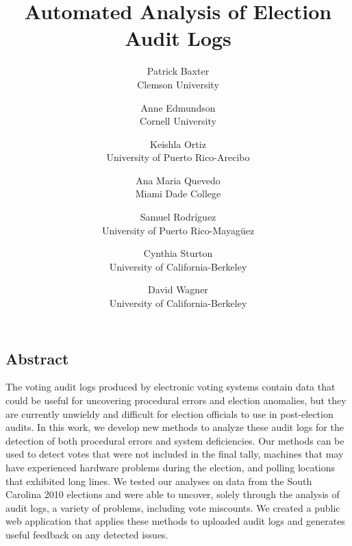 \documentclass[letterpaper,twocolumn,10pt]{article}
\begin{document}
\date{}

\title{\Large \bf Automated Analysis of Election Audit Logs}

\author{
 {\rm Patrick Baxter}\\
 Clemson University
 \and
 {\rm Anne Edmundson}\\
 Cornell University
 \and
 {\rm Keishla Ortiz}\\
University of Puerto Rico-Arecibo
 \and
 {\rm Ana Maria Quevedo}\\
Miami Dade College
 \and
 {\rm Samuel Rodr\'{i}guez}\\
University of Puerto Rico-Mayag\"uez
 \and
 {\rm Cynthia Sturton}\\
University of California-Berkeley
 \and
 {\rm David Wagner}\\
University of California-Berkeley
} %

\maketitle



\subsection*{Abstract}
The voting audit logs produced by electronic voting systems contain data
that could be useful for uncovering procedural errors and election anomalies,
but they 
are currently unwieldy and difficult for election officials to use in
post-election audits. In this work, we develop new methods to analyze these
audit logs for the detection of both procedural errors and system
deficiencies. Our methods can be used to detect votes that were not included in
the final tally, machines that may have experienced hardware problems during the
election, and polling locations that exhibited long lines. We tested our analyses on
data from the South Carolina 2010 elections and were able to uncover, solely
through the analysis of audit logs, a variety of problems, including vote
miscounts. We created a public web application that applies these methods to
uploaded audit logs and generates useful feedback on any detected issues.

 
\end{document}
